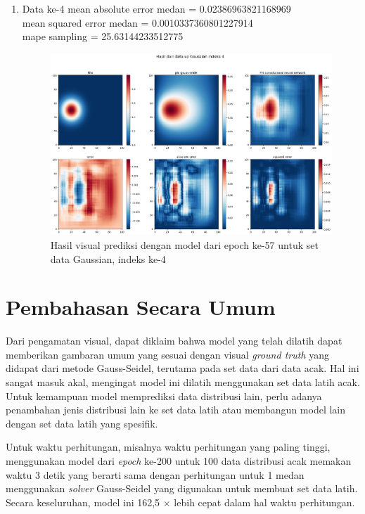 \begin{enumerate}
    \item Data ke-4
    mean absolute error medan =  0.02386963821168969\\
    mean squared error medan =  0.0010337360801227914\\
    mape sampling =  25.63144233512775
    \begin{figure}[h!]
    \centering
    \includegraphics[width=12cm]{gambar/4_57_gaussian.png}
    \caption{Hasil visual prediksi dengan model dari epoch ke-57 untuk set data Gaussian, indeks ke-4}
    \label{4_57_Gaussian}
    \end{figure}
    
\end{enumerate}

\section{Pembahasan Secara Umum}

Dari pengamatan visual, dapat diklaim bahwa model yang telah dilatih dapat memberikan gambaran umum yang sesuai dengan visual \textit{ground truth} yang didapat dari metode Gauss-Seidel, terutama pada set data dari data acak. Hal ini sangat masuk akal, mengingat model ini dilatih menggunakan set data latih acak. Untuk kemampuan model memprediksi data distribusi lain, perlu adanya penambahan jenis distribusi lain ke set data latih atau membangun model lain dengan set data latih yang spesifik.

Untuk waktu perhitungan, misalnya waktu perhitungan yang paling tinggi, menggunakan model dari \textit{epoch} ke-200 untuk 100 data distribusi acak memakan waktu 3 detik yang berarti sama dengan perhitungan untuk 1 medan menggunakan \textit{solver} Gauss-Seidel yang digunakan untuk membuat set data latih. Secara keseluruhan, model ini 162,5 $\times$ lebih cepat dalam hal waktu perhitungan.

